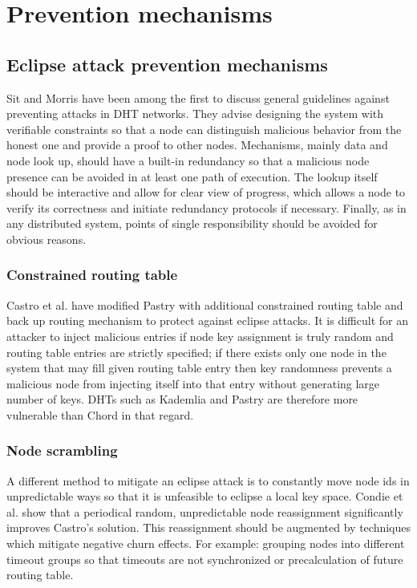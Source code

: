\section{Prevention mechanisms}
\label{sec:prevention_mechanisms}
\subsection{Eclipse attack prevention mechanisms}

  Sit and Morris \cite{sit02} have been among the first to discuss general
  guidelines against preventing attacks in DHT networks. They advise designing
  the system with verifiable constraints so that a node can distinguish
  malicious behavior from the honest one and provide a proof to other nodes.
  Mechanisms, mainly data and node look up, should have a built-in redundancy so
  that a malicious node presence can be avoided in at least one path of
  execution. The lookup itself should be interactive and allow for clear view of
  progress, which allows a node to verify its correctness and initiate
  redundancy protocols if necessary. Finally, as in any distributed system,
  points of single responsibility should be avoided for obvious reasons.
  
  \subsubsection{Constrained routing table}
  Castro et al. \cite{cas02} have modified Pastry with additional constrained
  routing table and back up routing mechanism to protect against eclipse
  attacks.
  It is difficult for an attacker to inject malicious entries if node key
  assignment is truly random and routing table entries are strictly specified;
  if there exists only one node in the system that may fill given routing table
  entry then key randomness prevents a malicious node from injecting itself into
  that entry without generating large number of keys.
  DHTs such as Kademlia and Pastry are therefore more vulnerable than Chord in
  that regard.

  \subsubsection{Node scrambling}
  A different method to mitigate an eclipse attack is to constantly move node
  ids in unpredictable ways so that it is unfeasible to eclipse a local
  key space. Condie et al. \cite{con06} show that a periodical random,
  unpredictable node reassignment significantly improves Castro's solution.
  This reassignment should be augmented by techniques which mitigate negative
  churn effects. For example: grouping nodes into different timeout groups so
  that timeouts are not synchronized or precalculation of future routing table.

